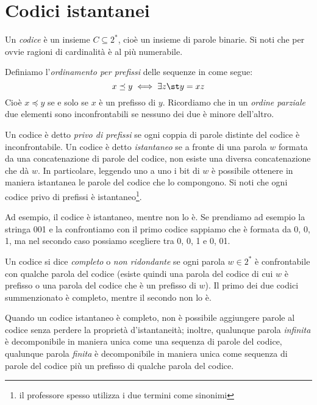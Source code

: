 \chapter{Codici istantanei}
Un \textit{codice} è un insieme $C \subseteq 2^*$, cioè un insieme di parole binarie. Si noti che per ovvie ragioni di cardinalità  è al più numerabile.

Definiamo l'\textit{ordinamento per prefissi} delle sequenze in  come segue:
\begin{equation}
	x \preceq y \iff \exists z \st y = xz
\end{equation}
Cioè $x \preceq y$ se e solo se $x$ è un prefisso di $y$. Ricordiamo che in un \textit{ordine parziale} due elementi sono inconfrontabili se nessuno dei due è minore dell'altro.

Un codice è detto \textit{privo di prefissi} se ogni coppia di parole distinte del codice è inconfrontabile. Un codice è detto \textit{istantaneo} se a fronte di una parola $w$ formata da una concatenazione di parole del codice, non esiste una diversa concatenazione che dà $w$. In particolare, leggendo uno a uno i bit di $w$ è possibile ottenere in maniera istantanea le parole del codice che lo compongono. Si noti che ogni codice privo di prefissi è istantaneo\footnote{il professore spesso utilizza i due termini come sinonimi}.

Ad esempio, il codice  è istantaneo, mentre  non lo è. Se prendiamo ad esempio la stringa 001 e la confrontiamo con il primo codice sappiamo che è formata da 0, 0, 1, ma nel secondo caso possiamo scegliere tra 0, 0, 1 e 0, 01.

Un codice si dice \textit{completo} o \textit{non ridondante} se ogni parola $w \in 2^*$ è confrontabile con qualche parola del codice (esiste quindi una parola del codice di cui $w$ è prefisso o una parola del codice che è un prefisso di $w$). Il primo dei due codici summenzionato è completo, mentre il secondo non lo è.

Quando un codice istantaneo è completo, non è possibile aggiungere parole al codice senza perdere la proprietà d'istantaneità; inoltre, qualunque parola \textit{infinita} è decomponibile in maniera unica come una sequenza di parole del codice, qualunque parola \textit{finita} è decomponibile in maniera unica come sequenza di parole del codice più un prefisso di qualche parola del codice.

